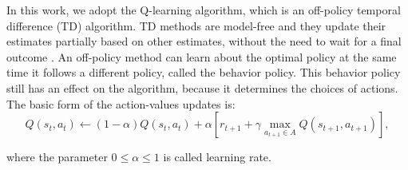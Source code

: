 In this work, we adopt the Q-learning algorithm, which is an off-policy temporal difference (TD) algorithm.
%
TD methods are model-free and they update their estimates partially based on other estimates, without the need to wait for a final outcome \cite{sutton2018rl}.
%
An off-policy method can learn about the optimal policy at the same time it follows a different policy, called the behavior policy.
%
This behavior policy still has an effect on the algorithm, because it determines the choices of actions. The basic form of the action-values updates is:
\begin{equation}\label{QlearningEq}
    Q\left(s_{t}, a_{t}\right) \leftarrow  (1-\alpha) Q\left(s_{t}, a_{t}\right)
    +\alpha\left[r_{t+1}+\gamma \max _{a_{t+1} \in A} Q\left(s_{t+1}, a_{t+1}\right)\right],
\end{equation}

\noindent where the parameter $0 \leq \alpha \leq 1$ is called learning rate.
%
%
%
%
